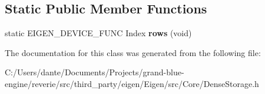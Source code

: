 \subsection*{Static Public Member Functions}
\begin{DoxyCompactItemize}
\item 
\mbox{\label{class_eigen_1_1_dense_storage_3_01_t_00_01_dynamic_00_01___rows_00_01_dynamic_00_01___options_01_4_a82629b531f76a7243c594c9e6d117a82}} 
static E\+I\+G\+E\+N\+\_\+\+D\+E\+V\+I\+C\+E\+\_\+\+F\+U\+NC Index {\bfseries rows} (void)
\end{DoxyCompactItemize}


The documentation for this class was generated from the following file\+:\begin{DoxyCompactItemize}
\item 
C\+:/\+Users/dante/\+Documents/\+Projects/grand-\/blue-\/engine/reverie/src/third\+\_\+party/eigen/\+Eigen/src/\+Core/Dense\+Storage.\+h\end{DoxyCompactItemize}
